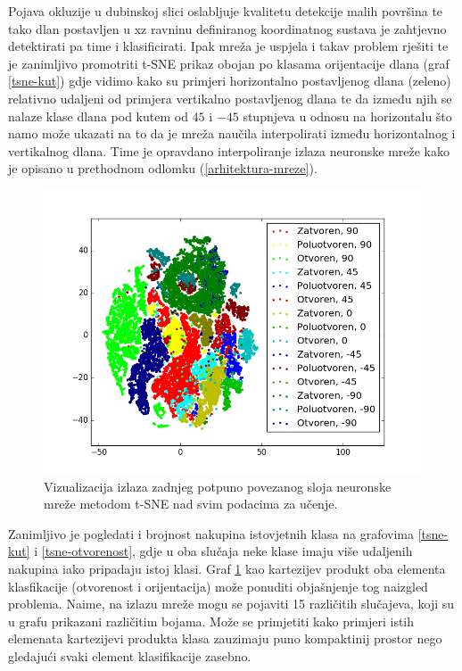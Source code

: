 \documentclass[times, utf8, diplomski, numeric]{fer}
\begin{document}
Pojava okluzije u dubinskoj slici oslabljuje kvalitetu detekcije malih površina te tako dlan postavljen u xz ravninu definiranog koordinatnog sustava je zahtjevno detektirati pa time i klasificirati. Ipak mreža je uspjela i takav problem rješiti te je zanimljivo promotriti t-SNE prikaz obojan po klasama orijentacije dlana (graf \ref{tsne-kut}) gdje vidimo kako su primjeri horizontalno postavljenog dlana (zeleno) relativno udaljeni od primjera vertikalno postavljenog dlana te da između njih se nalaze klase dlana pod kutem od $45$ i $-45$ stupnjeva u odnosu na horizontalu što namo može ukazati na to da je mreža naučila interpolirati između horizontalnog i vertikalnog dlana. Time je opravdano interpoliranje izlaza neuronske mreže kako je opisano u prethodnom odlomku (\ref{arhitektura-mreze}).


\begin{figure}[h!]
\centering
\includegraphics[width = 1.0\textwidth]{detekcija/train_all}
\caption{Vizualizacija izlaza zadnjeg potpuno povezanog sloja neuronske mreže metodom t-SNE nad svim podacima za učenje.} \label{tsne-all}
\end{figure}

Zanimljivo je pogledati i brojnost nakupina istovjetnih klasa na grafovima \ref{tsne-kut} i \ref{tsne-otvorenost}, gdje u oba slučaja neke klase imaju više udaljenih nakupina iako pripadaju istoj klasi. Graf \ref{tsne-all} kao kartezijev produkt oba elementa klasfikacije (otvorenost i orijentacija) može ponuditi objašnjenje tog naizgled problema. Naime, na izlazu mreže mogu se pojaviti 15 različitih slučajeva, koji su u grafu prikazani različitim bojama. Može se primjetiti kako primjeri istih elemenata kartezijevi produkta klasa zauzimaju puno kompaktinij prostor nego gledajući svaki element klasifikacije zasebno.
\end{document}

